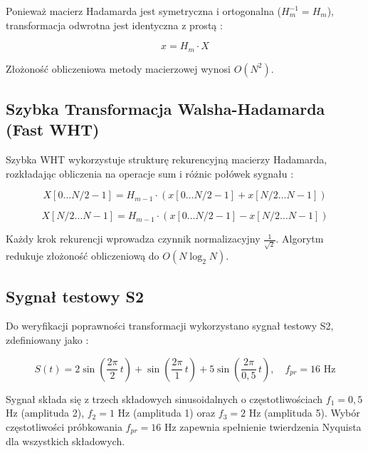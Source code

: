 \documentclass[12pt]{article}
\begin{document}
Ponieważ macierz Hadamarda jest symetryczna i ortogonalna ($H_m^{-1} = H_m$), transformacja odwrotna jest identyczna z prostą \cite{1}:

\begin{equation}
    x = H_m \cdot X
    \label{eq:iwht}
\end{equation}

Złożoność obliczeniowa metody macierzowej wynosi $O(N^2)$.

\subsection{Szybka Transformacja Walsha-Hadamarda (Fast WHT)}

Szybka WHT wykorzystuje strukturę rekurencyjną macierzy Hadamarda, rozkładając obliczenia na operacje sum i różnic połówek sygnału \cite{1}:

\begin{equation}
    X[0 \ldots N/2 - 1] = H_{m-1} \cdot (x[0 \ldots N/2-1] + x[N/2 \ldots N-1])
    \label{eq:fwht_upper}
\end{equation}

\begin{equation}
    X[N/2 \ldots N-1] = H_{m-1} \cdot (x[0 \ldots N/2-1] - x[N/2 \ldots N-1])
    \label{eq:fwht_lower}
\end{equation}

Każdy krok rekurencji wprowadza czynnik normalizacyjny $\frac{1}{\sqrt{2}}$. Algorytm redukuje złożoność obliczeniową do $O(N \log_2 N)$.

\subsection{Sygnał testowy S2}

Do weryfikacji poprawności transformacji wykorzystano sygnał testowy S2, zdefiniowany jako \cite{1}:

\begin{equation}
    S(t) = 2\sin\!\left(\frac{2\pi}{2}\,t\right) + \sin\!\left(\frac{2\pi}{1}\,t\right) + 5\sin\!\left(\frac{2\pi}{0{,}5}\,t\right), \quad f_{pr} = 16 \text{ Hz}
    \label{eq:S2}
\end{equation}

Sygnał składa się z trzech składowych sinusoidalnych o częstotliwościach $f_1 = 0{,}5$ Hz (amplituda 2), $f_2 = 1$ Hz (amplituda 1) oraz $f_3 = 2$ Hz (amplituda 5). Wybór częstotliwości próbkowania $f_{pr} = 16$ Hz zapewnia spełnienie twierdzenia Nyquista dla wszystkich składowych.
\end{document}
